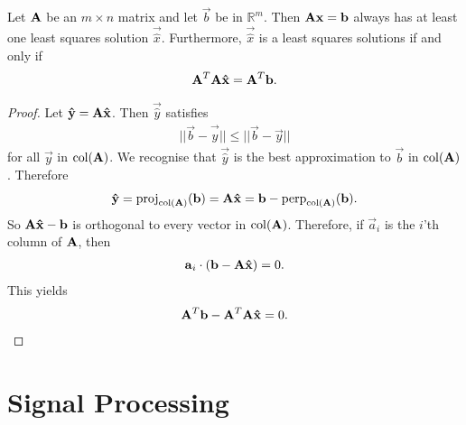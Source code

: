 \documentclass{memoir}
\newcommand{\proj}{\operatorname{proj}}
\newcommand{\Perp}{\operatorname{perp}}
\newcommand{\col}{\operatorname{col}}
\begin{document}
\begin{theorem}
    Let $\boldsymbol{\mathbf{A}}$ be an $m \times n$ matrix and let $\vec{b}$ be in $\mathbb{R}^m$. Then $\boldsymbol{\mathbf{A}} \boldsymbol{\mathbf{x}} = \boldsymbol{\mathbf{b}}$ always has at least one least squares solution $\vec{\hat{x}}$. Furthermore, $\vec{\hat{x}}$ is a least squares solutions if and only if
    \begin{align*}
        \boldsymbol{\mathbf{A}}^T \boldsymbol{\mathbf{A}} \boldsymbol{\mathbf{\hat{x}}} = \boldsymbol{\mathbf{A}}^T \boldsymbol{\mathbf{b}}.
    \end{align*}
\end{theorem}
\begin{proof}
    Let $\boldsymbol{\mathbf{\hat{y}}}=\boldsymbol{\mathbf{A}}\boldsymbol{\mathbf{\hat{x}}}$. Then $\vec{\hat{y}}$ satisfies
    \begin{align*}
        ||\vec{b} - \vec{\hat{y}}|| \le ||\vec{b} - \vec{y}||
    \end{align*}
    for all $\vec{y}$ in $\col(\mat{A})$. We recognise that $\vec{\hat{y}}$ is the best approximation to $\vec{b}$ in $\col(\mat{A})$. Therefore
    \begin{align*}
        \vec{\hat{y}} = \proj_{\col(\mat{A})}(\vec{b}) = \mat{A}\vec{\hat{x}} = \vec{b} - \Perp_{\col(\mat{A})}(\vec{b}).
    \end{align*}
    So $\boldsymbol{\mathbf{A}}\boldsymbol{\mathbf{\hat{x}}} - \boldsymbol{\mathbf{b}}$ is orthogonal to every vector in $\col(\mat{A})$. Therefore, if $\vec{a}_i$ is the $i$'th column of $\boldsymbol{\mathbf{A}}$, then
    \begin{align*}
        \boldsymbol{\mathbf{a}}_i \cdot (\boldsymbol{\mathbf{b}} - \boldsymbol{\mathbf{A}} \boldsymbol{\mathbf{\hat{x}}}) = 0.
    \end{align*}
    This yields
    \begin{align*}
        \boldsymbol{\mathbf{A}}^T \boldsymbol{\mathbf{b}} - \boldsymbol{\mathbf{A}}^T \boldsymbol{\mathbf{A}} \boldsymbol{\mathbf{\hat{x}}}=0.
    \end{align*}
\end{proof}

\chapter{Signal Processing}
\end{document}
